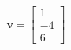 \documentclass[preview]{standalone}
\begin{document}
\begin{align*}
\mathbf{v} = \begin{bmatrix}1 \\ -4 \\ 6\end{bmatrix}
\end{align*}
\end{document}
